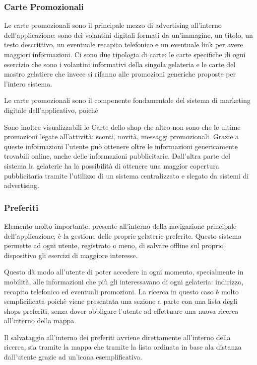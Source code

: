 \subsubsection{Carte Promozionali}
Le carte promozionali sono il principale mezzo di advertising all'interno dell'applicazione: sono dei volantini digitali formati da un'immagine, un titolo, un testo descrittivo, un eventuale recapito telefonico e un eventuale link per avere maggiori informazioni.
Ci sono due tipologia di carte: le carte specifiche di ogni esercizio che sono i volantini informativi della singola gelateria e le carte del mastro gelatiere che invece si rifanno alle promozioni generiche proposte per l'intero sistema.

Le carte promozionali sono il componente fondamentale del sistema di marketing digitale dell'applicativo, poichè 

Sono inoltre visualizzabili le Carte dello shop che altro non sono che le ultime promozioni legate all'attività: sconti, novità, messaggi promozionali.
Grazie a queste informazioni l'utente può ottenere oltre le informazioni genericamente trovabili online, anche delle informazioni pubblicitarie.
Dall'altra parte del sistema la gelaterie ha la possibilità di ottenere una maggior copertura pubblicitaria tramite l'utilizzo di un sistema centralizzato e slegato da sistemi di advertising.

\subsubsection{Preferiti}
Elemento molto importante, presente all'interno della navigazione principale dell'applicazione, è la gestione delle proprie gelaterie preferite.
Questo sistema permette ad ogni utente, registrato o meno, di salvare offline sul proprio dispositivo gli esercizi di maggiore interesse.

Questo dà modo all'utente di poter accedere in ogni momento, specialmente in mobilità, alle informazioni che più gli interessavano di ogni gelateria: indirizzo, recapito telefonico ed eventuali promozioni.
La ricerca in questo caso è molto semplicificata poichè viene presentata una sezione a parte con una lista degli shops preferiti, senza dover obbligare l'utente ad effettuare una nuova ricerca all'interno della mappa.

Il salvataggio all'interno dei preferiti avviene direttamente all'interno della ricerca, sia tramite la mappa che tramite la lista ordinata in base ala distanza dall'utente grazie ad un'icona esemplificativa.

